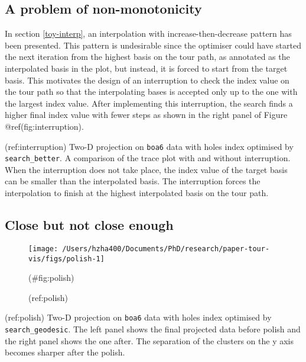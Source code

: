 \hypertarget{monotonic}{%
\subsection{A problem of non-monotonicity}\label{monotonic}}

In section \ref{toy-interp}, an interpolation with increase-then-decrease pattern has been presented. This pattern is undesirable since the optimiser could have started the next iteration from the highest basis on the tour path, as annotated as the interpolated basis in the plot, but instead, it is forced to start from the target basis. This motivates the design of an interruption to check the index value on the tour path so that the interpolating bases is accepted only up to the one with the largest index value. After implementing this interruption, the search finds a higher final index value with fewer steps as shown in the right panel of Figure @ref(fig:interruption).

(ref:interruption) Two-D projection on \texttt{boa6} data with holes index optimised by \texttt{search\_better}. A comparison of the trace plot with and without interruption. When the interruption does not take place, the index value of the target basis can be smaller than the interpolated basis. The interruption forces the interpolation to finish at the highest interpolated basis on the tour path.

\hypertarget{close-but-not-close-enough}{%
\subsection{Close but not close enough}\label{close-but-not-close-enough}}

\begin{Schunk}
\begin{figure}

{\centering \texttt{[image: /Users/hzha400/Documents/PhD/research/paper-tour-vis/figs/polish-1]} 

}

\caption[(ref:polish)]{(ref:polish)}(\#fig:polish)
\end{figure}
\end{Schunk}

(ref:polish) Two-D projection on \texttt{boa6} data with holes index optimised by \texttt{search\_geodesic}. The left panel shows the final projected data before polish and the right panel shows the one after. The separation of the clusters on the y axis becomes sharper after the polish.

